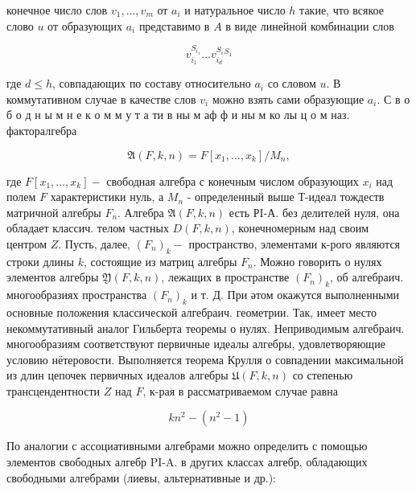 \documentclass[10pt]{article}
\begin{document}
конечное число слов $v_{1}, \ldots, v_{m}$ от $a_{i}$ и натуральное число $h$ такие, что всякое слово $u$ от образующих $a_{i}$ представимо в $A$ в виде линейной комбинации слов



\[

v_{i_{1}}^{S_{i_{1}}} \ldots v_{i_{d}}^{S_{i}}{ }^{S_{1}}

\]



где $d \leqslant h$, совпадающих по составу относительно $a_{i}$ со словом $u$. В коммутативном случае в качестве слов $v_{i}$ можно взять сами образующие $a_{i}$. С в о б о д н ы м н е к о м м у т а ти в ны м аф ф и ны м ко лы ц о м наз. факторалгебра



\[

\mathfrak{A}(F, k, n)=F\left[x_{1}, \ldots, x_{k}\right] / M_{n},

\]



где $F\left[x_{1}, \ldots, x_{k}\right]-$ свободная алгебра с конечным числом образующих $x_{i}$ над полем $F$ характеристики нуль, а $M_{n}$ - определенный выше Т-идеал тождеств матричной алгебры $F_{n}$. Алгебра $\mathfrak{A}(F, k, n)$ есть РI-А. без делителей нуля, она обладает классич. телом частных $D(F, k, n)$, конечномерным над своим центром $Z$. Пусть, далее, $\left(F_{n}\right)_{k}-$ пространство, элементами к-рого являются строки длины $k$, состоящие из матриц алгебры $F_{n}$. Можно говорить о нулях элементов алгебры $\mathfrak{Y}(F, k, n)$, лежащих в пространстве $\left(F_{n}\right)_{k}$, об алгебраич. многообразиях пространства $\left(F_{n}\right)_{k}$ и т. Д. При әтом окажутся выполненными основные положения классической алгебраич. геометрии. Так, имеет место некоммутативный аналог Гильберта теоремы о нулях. Неприводимым алгебраич. многообразиям соответствуют первичные идеалы алгебры, удовлетворяющие условию нётеровости. Выполняется теорема Крулля о совпадении максимальной из длин цепочек первичных идеалов алгебры $\mathfrak{U}(F, k, n)$ со степенью трансцендентности $Z$ над $F$, к-рая в рассматриваемом случае равна



\[

k n^{2}-\left(n^{2}-1\right)

\]



По аналогии с ассоциативными алгебрами можно определить с помощью элементов свободных алгебр PI-A. в других классах алгебр, обладающих свободными алгебрами (лиевы, альтернативные и др.):
\end{document}
